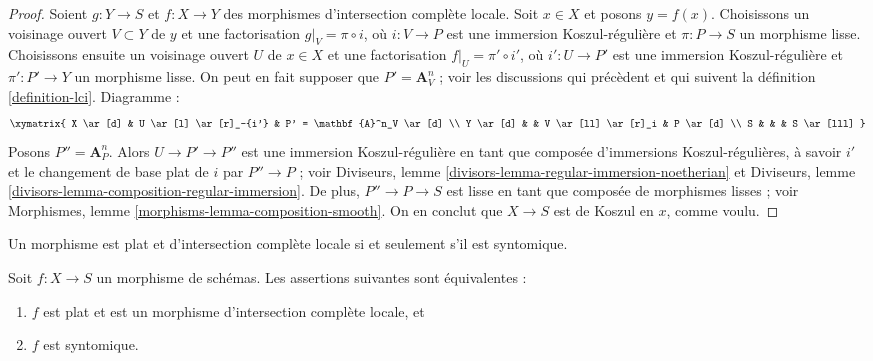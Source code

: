 \begin{proof}
Soient $g : Y \to S$ et $f : X \to Y$ des morphismes d'intersection complète
locale. Soit $x \in X$ et posons $y = f(x)$. Choisissons un voisinage ouvert
$V \subset Y$ de $y$ et une factorisation $g|_V = \pi \circ i$, où
$i : V \to P$ est une immersion Koszul-régulière et $\pi : P \to S$ un morphisme lisse.
Choisissons ensuite un voisinage ouvert $U$ de $x \in X$ et une factorisation
$f|_U = \pi' \circ i'$, où $i' : U \to P'$ est une immersion Koszul-régulière
et $\pi' : P' \to Y$ un morphisme lisse. On peut en fait supposer que
$P' = \mathbf{A}^n_V$ ; voir les discussions qui précèdent et qui suivent la
définition \ref{definition-lci}. Diagramme :
$$
\xymatrix{
X \ar[d] & U \ar[l] \ar[r]_-{i'} & P' = \mathbf{A}^n_V \ar[d] \\
Y \ar[d] &  & V \ar[ll] \ar[r]_i & P \ar[d] \\
S & & & S \ar[lll]
}
$$
Posons $P'' = \mathbf{A}^n_P$. Alors $U \to P' \to P''$ est une
immersion Koszul-régulière en tant que composée
d'immersions Koszul-régulières, à savoir $i'$ et le changement de base plat de
$i$ par $P'' \to P$ ; voir
Diviseurs,
lemme \ref{divisors-lemma-regular-immersion-noetherian}
et
Diviseurs, lemme \ref{divisors-lemma-composition-regular-immersion}.
De plus, $P'' \to P \to S$ est lisse en tant que composée de morphismes lisses ;
voir
Morphismes, lemme \ref{morphisms-lemma-composition-smooth}.
On en conclut que $X \to S$ est de Koszul en $x$, comme voulu.
\end{proof}

\begin{lemma}
\label{lemma-flat-lci}
\begin{slogan}
Un morphisme est plat et d'intersection complète locale si et seulement s'il est syntomique.
\end{slogan}
Soit $f : X \to S$ un morphisme de schémas.
Les assertions suivantes sont équivalentes :
\begin{enumerate}
\item $f$ est plat et est un morphisme d'intersection complète locale, et
\item $f$ est syntomique.
\end{enumerate}
\end{lemma}


